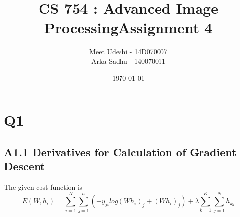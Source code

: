 \documentclass{article}
\title{CS 754 : Advanced Image ProcessingAssignment 4}
\author{Meet Udeshi - 14D070007\\
  Arka Sadhu - 140070011\\
}
\date{\today}
\begin{document}
\maketitle
\section*{Q1}
\subsection*{A1.1 Derivatives for Calculation of Gradient Descent}
The given cost function is
\begin{equation}
  \label{eq:1}
  E(W,{h_i}) = \sum_{i=1}^N\sum_{j=1}^n(-y_{ji}log(Wh_i)_j + (Wh_i)_j) + \lambda\sum_{k=1}^K\sum_{j=1}^Nh_{kj}
\end{equation}
\end{document}
